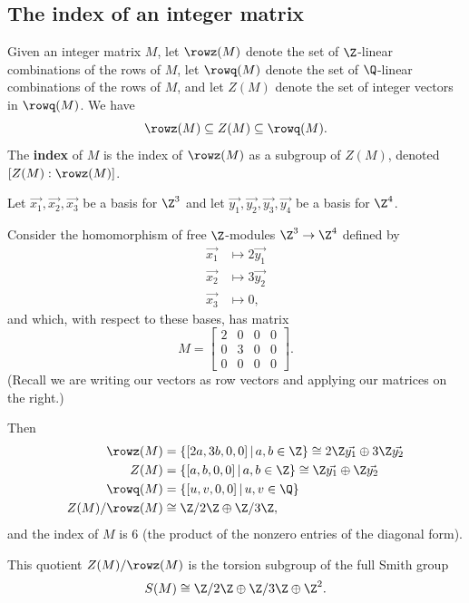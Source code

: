 \subsection{The index of an integer matrix}

Given an integer matrix $M$, let $\rowz(M)$ denote the set of $\Z$-linear combinations of the rows of $M$, let $\rowq(M)$ denote the set of $\Q$-linear combinations of the rows of $M$, and let $Z(M)$ denote the set of integer vectors in $\rowq(M)$.  We have
\[
\rowz(M) \subseteq Z(M) \subseteq \rowq(M).
\]
The {\bf index} of $M$ is the index of $\rowz(M)$ as a subgroup of $Z(M)$, denoted $[Z(M) : \rowz(M)]$.  

\begin{example}
    Let $\vec{x_{1}}, \vec{x_{2}}, \vec{x_{3}}$ be a basis for $\Z^{3}$ and let $\vec{y_{1}}, \vec{y_{2}},\vec{y_{3}},\vec{y_{4}}$ be a basis for $\Z^{4}$.  
    
    Consider the homomorphism of free $\Z$-modules $\Z^{3} \to \Z^{4}$ defined by
    \begin{align*}
    \vec{x_{1}} &\mapsto 2\vec{y_{1}}\\
    \vec{x_{2}} &\mapsto 3\vec{y_{2}}\\
    \vec{x_{3}} &\mapsto 0,
    \end{align*}
    and which, with respect to these bases, has matrix
    \[M =
    \begin{bmatrix}
        2 & 0 & 0 & 0\\
        0 & 3 & 0 & 0\\
        0 & 0 & 0 & 0
    \end{bmatrix}.
    \]
    (Recall we are writing our vectors as row vectors and applying our matrices on the right.)

    Then 
    \begin{align*}
        \rowz(M) &= \{[2a,3b,0,0] \, \vert \, a,b \in \Z\} \cong 2\Z \vec{y_{1}} \oplus 3\Z \vec{y_{2}}\\
        Z(M) &= \{[a,b,0,0] \, \vert \, a,b \in \Z\} \cong \Z \vec{y_{1}} \oplus \Z \vec{y_{2}}\\
        \rowq(M) &= \{[u,v,0,0] \, \vert \, u,v \in \Q\}\\
        Z(M) / \rowz(M) &\cong \Z/2\Z \oplus \Z/3\Z,
    \end{align*}
    and the index of $M$ is $6$ (the product of the nonzero entries of the diagonal form).
   
    This quotient $Z(M) / \rowz(M)$ is the torsion subgroup of the full Smith group 
    \[
    S(M) \cong \Z/2\Z \oplus \Z/3\Z \oplus \Z^{2}.
    \]   
\end{example}

